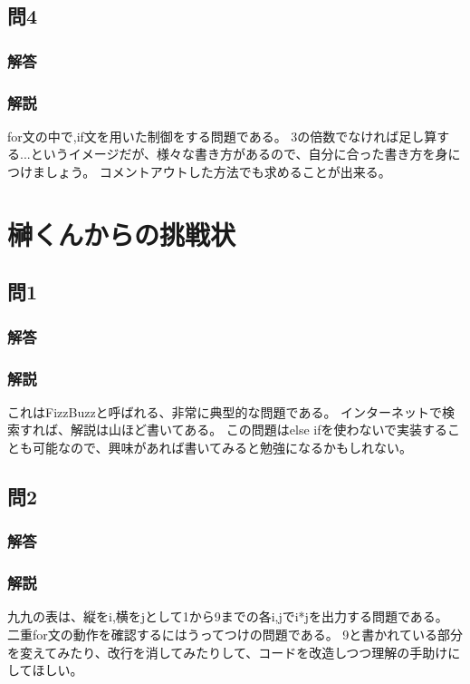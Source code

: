 \subsection{問4}
\subsubsection{解答}

\subsubsection{解説}
for文の中で,if文を用いた制御をする問題である。
3の倍数でなければ足し算する...というイメージだが、様々な書き方があるので、自分に合った書き方を身につけましょう。
コメントアウトした方法でも求めることが出来る。

\section{榊くんからの挑戦状}
\subsection{問1}
\subsubsection{解答}

\subsubsection{解説}
これはFizzBuzzと呼ばれる、非常に典型的な問題である。
インターネットで検索すれば、解説は山ほど書いてある。
この問題はelse ifを使わないで実装することも可能なので、興味があれば書いてみると勉強になるかもしれない。


\subsection{問2}
\subsubsection{解答}

\subsubsection{解説}
九九の表は、縦をi,横をjとして1から9までの各i,jでi*jを出力する問題である。
二重for文の動作を確認するにはうってつけの問題である。
9と書かれている部分を変えてみたり、改行を消してみたりして、コードを改造しつつ理解の手助けにしてほしい。


